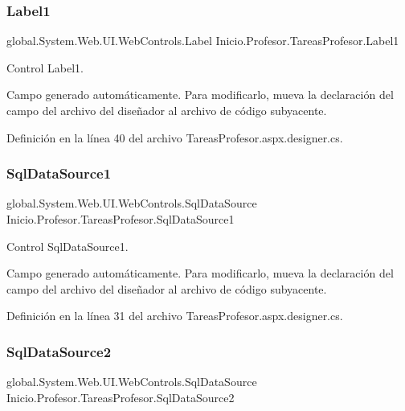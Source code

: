 \subsubsection{\texorpdfstring{Label1}{Label1}}
{\footnotesize\ttfamily global.\+System.\+Web.\+U\+I.\+Web\+Controls.\+Label Inicio.\+Profesor.\+Tareas\+Profesor.\+Label1\hspace{0.3cm}{\ttfamily [protected]}}



Control Label1. 

Campo generado automáticamente. Para modificarlo, mueva la declaración del campo del archivo del diseñador al archivo de código subyacente. 

Definición en la línea 40 del archivo Tareas\+Profesor.\+aspx.\+designer.\+cs.

\mbox{\label{classInicio_1_1Profesor_1_1TareasProfesor_ac0c4b42b4dff451653b2c157a39b6cc9}} 
\subsubsection{\texorpdfstring{SqlDataSource1}{SqlDataSource1}}
{\footnotesize\ttfamily global.\+System.\+Web.\+U\+I.\+Web\+Controls.\+Sql\+Data\+Source Inicio.\+Profesor.\+Tareas\+Profesor.\+Sql\+Data\+Source1\hspace{0.3cm}{\ttfamily [protected]}}



Control Sql\+Data\+Source1. 

Campo generado automáticamente. Para modificarlo, mueva la declaración del campo del archivo del diseñador al archivo de código subyacente. 

Definición en la línea 31 del archivo Tareas\+Profesor.\+aspx.\+designer.\+cs.

\mbox{\label{classInicio_1_1Profesor_1_1TareasProfesor_a8cd37a2e5689f618468f816fd81b6334}} 
\subsubsection{\texorpdfstring{SqlDataSource2}{SqlDataSource2}}
{\footnotesize\ttfamily global.\+System.\+Web.\+U\+I.\+Web\+Controls.\+Sql\+Data\+Source Inicio.\+Profesor.\+Tareas\+Profesor.\+Sql\+Data\+Source2\hspace{0.3cm}{\ttfamily [protected]}}



